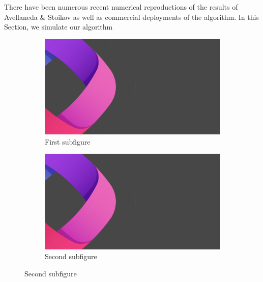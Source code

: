 \documentclass{article}
\begin{document}
There have been numerous recent numerical reproductions of the results of Avellaneda \& Stoikov \cite{fushimi2018optimal} as well as commercial deployments of the algorithm. In this Section, we simulate our algorithm 

\begin{figure}[t!]

\begin{subfigure}{0.48\textwidth}
\includegraphics[width=\linewidth]{title.png}
\caption{First subfigure} \label{fig:a}
\end{subfigure}\hspace*{\fill}
\begin{subfigure}{0.48\textwidth}
\includegraphics[width=\linewidth]{title.png}
\caption{Second subfigure} \label{fig:b}
\end{subfigure}


\end{figure}
\end{document}
